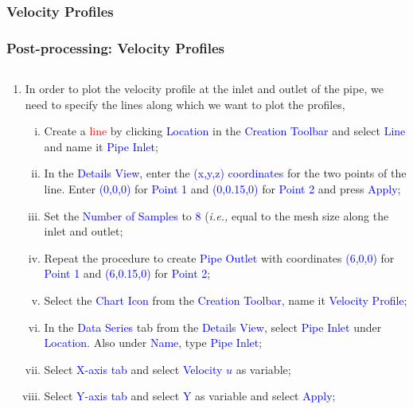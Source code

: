 \documentclass[10pt,compress, unknownkeysallowed]{beamer}
\newcommand{\red}{\textcolor{red}}
\newcommand{\blue}{\textcolor{blue}}
\newcommand{\ie}{{\it i.e., }}
\begin{document}
\subsubsection{Velocity Profiles}

\begin{frame}
  \frametitle{Post-processing: Velocity Profiles}
    \begin{columns}
        \begin{column}[l]{0.5\linewidth}
           \begin{enumerate}\scriptsize%
                \item<1-> In order to plot the velocity profile at the inlet and outlet of the pipe, we need to specify the lines along which we want to plot the profiles,
                    \begin{enumerate}[i)]\scriptsize
                       \item<2-> Create a \red{line} by clicking \blue{Location} in the \blue{Creation Toolbar} and select \blue{Line} and name it \blue{Pipe Inlet};
                       \item<2-> In the \blue{Details View}, enter the \blue{(x,y,z) coordinates} for the two points of the line. Enter \blue{(0,0,0)} for \blue{Point 1} and \blue{(0,0.15,0)} for \blue{Point 2} and press \blue{Apply};
                       \item<2-> Set the \blue{Number of Samples} to \blue{8} (\ie equal to the mesh size along the inlet and outlet;
                       \item<2-> Repeat the procedure to create \blue{Pipe Outlet} with coordinates \blue{(6,0,0)} for \blue{Point 1} and \blue{(6,0.15,0)} for \blue{Point 2};
                       \item<2-> Select the \blue{Chart Icon} from the \blue{Creation Toolbar}, name it \blue{Velocity Profile};
                       \item<2-> In the \blue{Data Series} tab from the \blue{Details View}, select \blue{Pipe Inlet} under \blue{Location}. Also under \blue{Name}, type \blue{Pipe Inlet};
                       \item<2-> Select \blue{X-axis tab} and select \blue{Velocity $u$} as variable;
                       \item<2-> Select \blue{Y-axis tab} and select \blue{Y} as variable and select \blue{Apply};
                    \end{enumerate}                    

\end{enumerate}
\end{column}
\end{columns}
\end{frame}
\end{document}
